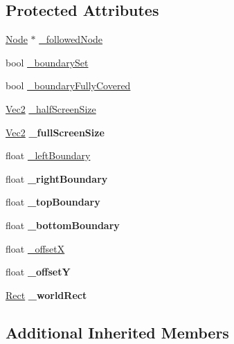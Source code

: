 \subsection*{Protected Attributes}
\begin{DoxyCompactItemize}
\item 
\hyperlink{classNode}{Node} $\ast$ \hyperlink{classFollow_af63d9e8e625928e14a136c8863c169f6}{\+\_\+followed\+Node}
\item 
bool \hyperlink{classFollow_ae5a6e0a9e3f1d180402ace7d3c490522}{\+\_\+boundary\+Set}
\item 
bool \hyperlink{classFollow_a958de05f28457629d790286543c6515c}{\+\_\+boundary\+Fully\+Covered}
\item 
\hyperlink{classVec2}{Vec2} \hyperlink{classFollow_a2df2f05667003edf790632c83fe627dd}{\+\_\+half\+Screen\+Size}
\item 
\mbox{\label{classFollow_ae685f172af6fe0fe830aefaf2fb80948}} 
\hyperlink{classVec2}{Vec2} {\bfseries \+\_\+full\+Screen\+Size}
\item 
float \hyperlink{classFollow_a8f5c6d5f04b050b3462d7fe5f1f640a2}{\+\_\+left\+Boundary}
\item 
\mbox{\label{classFollow_a36a2739bfa03088bf81a085b662c9894}} 
float {\bfseries \+\_\+right\+Boundary}
\item 
\mbox{\label{classFollow_a889f6fd46244e713a103b6deafa18dbe}} 
float {\bfseries \+\_\+top\+Boundary}
\item 
\mbox{\label{classFollow_aa9f0dc754b1219373e8de6b5b89e2f84}} 
float {\bfseries \+\_\+bottom\+Boundary}
\item 
float \hyperlink{classFollow_a52ca44d435542259d21f9e27bc24bb77}{\+\_\+offsetX}
\item 
\mbox{\label{classFollow_acbfc79d624c19bf6c9c5a71d31c0eb2d}} 
float {\bfseries \+\_\+offsetY}
\item 
\mbox{\label{classFollow_abbf579e1665208c3e046f15e1f8c3631}} 
\hyperlink{classRect}{Rect} {\bfseries \+\_\+world\+Rect}
\end{DoxyCompactItemize}
\subsection*{Additional Inherited Members}


